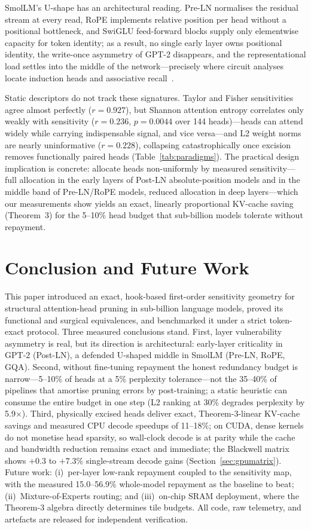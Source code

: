 \documentclass[10pt,journal,compsoc]{IEEEtran}
\begin{document}
SmolLM's U-shape has an architectural reading. Pre-LN normalises the residual
stream at every read, RoPE implements relative position per head without a
positional bottleneck, and SwiGLU feed-forward blocks supply only
elementwise capacity for token identity; as a result, no single early layer owns
positional identity, the write-once asymmetry of GPT-2 disappears, and the
representational load settles into the middle of the network---precisely where
circuit analyses locate induction heads and associative recall~\cite{elhage2021mathematical,
olsson2022context}.

Static descriptors do not track these signatures. Taylor and Fisher sensitivities
agree almost perfectly ($r=0.927$), but Shannon attention entropy correlates only
weakly with sensitivity ($r=0.236$, $p=0.0044$ over 144 heads)---heads can attend
widely while carrying indispensable signal, and vice versa---and L2 weight norms
are nearly uninformative ($r=0.228$), collapsing catastrophically once excision
removes functionally paired heads (Table~\ref{tab:paradigms}). The practical
design implication is concrete: allocate heads non-uniformly by measured
sensitivity---full allocation in the early layers of Post-LN absolute-position
models and in the middle band of Pre-LN/RoPE models, reduced allocation in deep
layers---which our measurements show yields an exact, linearly proportional
KV-cache saving (Theorem~3) for the 5--10\% head budget that sub-billion models
tolerate without repayment.

\section{Conclusion and Future Work}
This paper introduced an exact, hook-based first-order sensitivity geometry for
structural attention-head pruning in sub-billion language models, proved its
functional and surgical equivalences, and benchmarked it under a strict
token-exact protocol. Three measured conclusions stand. First, layer vulnerability asymmetry is real, but its direction is
architectural: early-layer criticality in GPT-2 (Post-LN), a defended U-shaped
middle in SmolLM (Pre-LN, RoPE, GQA). Second, without fine-tuning repayment the
honest redundancy budget is narrow---5--10\% of heads at a 5\% perplexity
tolerance---not the 35--40\% of pipelines that amortise pruning errors by
post-training; a static heuristic can consume the entire budget in one step
(L2 ranking at 30\% degrades perplexity by 5.9$\times$). Third,
physically excised heads deliver exact, Theorem-3-linear KV-cache savings and
measured CPU decode speedups of 11--18\%; on CUDA, dense kernels do not
monetise head sparsity, so wall-clock decode is at parity while the cache and
bandwidth reduction remains exact and immediate; the Blackwell matrix shows
$+0.3$ to $+7.3\%$ single-stream decode gains (Section~\ref{sec:gpumatrix}).
Future work: (i)~per-layer low-rank repayment coupled to the sensitivity map,
with the measured 15.0--56.9\% whole-model repayment as the baseline to beat;
(ii)~Mixture-of-Experts routing; and (iii)~on-chip SRAM deployment, where the
Theorem-3 algebra directly determines tile budgets. All code, raw telemetry,
and artefacts are released for independent verification.
\end{document}
